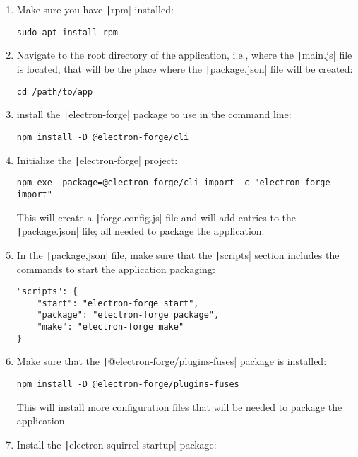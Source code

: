 \begin{enumerate}
    \item Make sure you have \texttt|rpm| installed:
    \begin{verbatim}
sudo apt install rpm
    \end{verbatim}
    \item Navigate to the root directory of the application, i.e., where the
    \texttt|main.js| file is located, that will be the place where the
    \texttt|package.json| file will be created:
    \begin{verbatim}
cd /path/to/app
    \end{verbatim}
    \item install the \texttt|electron-forge| package to use in the command line:
    \begin{verbatim}
npm install -D @electron-forge/cli
    \end{verbatim}
    \item Initialize the \texttt|electron-forge| project:
    \begin{verbatim}
npm exe -package=@electron-forge/cli import -c "electron-forge import"
    \end{verbatim}
    This will create a \texttt|forge.config.js| file and will add entries to the
    \texttt|package.json| file; all needed to package the application.
    \item In the \texttt|package,json| file, make sure that the \texttt|scripts|
    section includes the commands to start the application packaging:
    \begin{verbatim}
"scripts": {
    "start": "electron-forge start",
    "package": "electron-forge package",
    "make": "electron-forge make"
}
    \end{verbatim}
    \item Make sure that the \texttt|@electron-forge/plugins-fuses| package is installed:
    \begin{verbatim}
npm install -D @electron-forge/plugins-fuses
    \end{verbatim}
    This will install more configuration files that will be needed to package the application.
    \item Install the \texttt|electron-squirrel-startup| package:
    \begin{verbatim}

\end{verbatim}
\end{enumerate}

